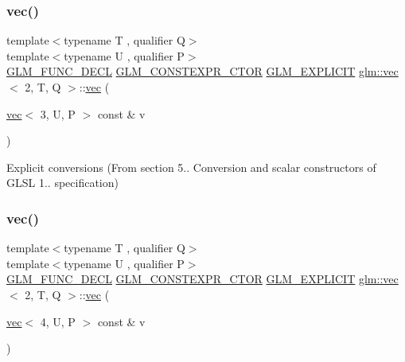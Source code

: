 \mbox{\label{structglm_1_1vec_3_012_00_01_t_00_01_q_01_4_a5b7cfdc305cd9c9cbedd6bdb8348e48c}} 
\subsubsection{\texorpdfstring{vec()}{vec()}\hspace{0.1cm}{\footnotesize\ttfamily [8/17]}}
{\footnotesize\ttfamily template$<$typename T , qualifier Q$>$ \\
template$<$typename U , qualifier P$>$ \\
\mbox{\hyperlink{setup_8hpp_ab2d052de21a70539923e9bcbf6e83a51}{G\+L\+M\+\_\+\+F\+U\+N\+C\+\_\+\+D\+E\+CL}} \mbox{\hyperlink{setup_8hpp_ad34178a09666081abdb573c14d1f4a5a}{G\+L\+M\+\_\+\+C\+O\+N\+S\+T\+E\+X\+P\+R\+\_\+\+C\+T\+OR}} \mbox{\hyperlink{setup_8hpp_a6c74f5a5e7b134ab69023ff9a30d4d5d}{G\+L\+M\+\_\+\+E\+X\+P\+L\+I\+C\+IT}} \mbox{\hyperlink{structglm_1_1vec}{glm\+::vec}}$<$ 2, T, Q $>$\+::\mbox{\hyperlink{structglm_1_1vec}{vec}} (\begin{DoxyParamCaption}\item[{\mbox{\hyperlink{structglm_1_1vec}{vec}}$<$ 3, U, P $>$ const \&}]{v }\end{DoxyParamCaption})}



Explicit conversions (From section 5.. Conversion and scalar constructors of G\+L\+SL 1.. specification) 

\mbox{\label{structglm_1_1vec_3_012_00_01_t_00_01_q_01_4_a2f77cbeba0c2efa024d10e348636c7c1}} 
\subsubsection{\texorpdfstring{vec()}{vec()}\hspace{0.1cm}{\footnotesize\ttfamily [9/17]}}
{\footnotesize\ttfamily template$<$typename T , qualifier Q$>$ \\
template$<$typename U , qualifier P$>$ \\
\mbox{\hyperlink{setup_8hpp_ab2d052de21a70539923e9bcbf6e83a51}{G\+L\+M\+\_\+\+F\+U\+N\+C\+\_\+\+D\+E\+CL}} \mbox{\hyperlink{setup_8hpp_ad34178a09666081abdb573c14d1f4a5a}{G\+L\+M\+\_\+\+C\+O\+N\+S\+T\+E\+X\+P\+R\+\_\+\+C\+T\+OR}} \mbox{\hyperlink{setup_8hpp_a6c74f5a5e7b134ab69023ff9a30d4d5d}{G\+L\+M\+\_\+\+E\+X\+P\+L\+I\+C\+IT}} \mbox{\hyperlink{structglm_1_1vec}{glm\+::vec}}$<$ 2, T, Q $>$\+::\mbox{\hyperlink{structglm_1_1vec}{vec}} (\begin{DoxyParamCaption}\item[{\mbox{\hyperlink{structglm_1_1vec}{vec}}$<$ 4, U, P $>$ const \&}]{v }\end{DoxyParamCaption})}



